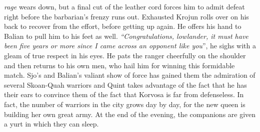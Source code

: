 {\itshape rage} wears down, but a final cut of the leather cord forces him to admit defeat right before the barbarian's frenzy runs out. Exhausted Krojun rolls over on his back to recover from the effort, before getting up again. He offers his hand to Balian to pull him to his feet as well. {\itshape``Congratulations, lowlander, it must have been five years or more since I came across an opponent like you}'', he sighs with a gleam of true respect in his eyes. He pats the ranger cheerfully on the shoulder and then returns to his own men, who hail him for winning this formidable match. Sjo's and Balian's valiant show of force has gained them the admiration of several Skoan-Quah warriors and Quint takes advantage of the fact that he has their ears to convince them of the fact that Korvosa is far from defenseless. In fact, the number of warriors in the city grows day by day, for the new queen is building her own great army. At the end of the evening, the companions are given a yurt in which they can sleep.\\


